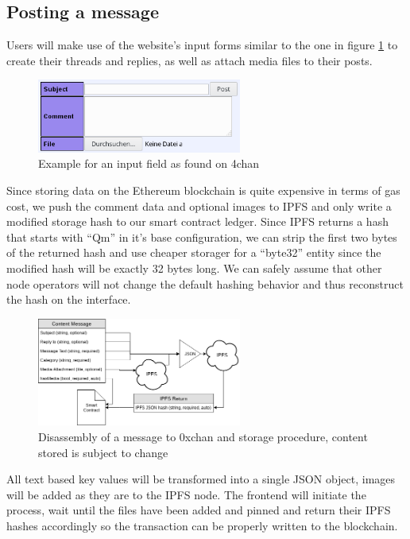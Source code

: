 \documentclass[a4paper]{article}
\begin{document}
\subsection{Posting a message}
Users will make use of the website's input forms similar to the one in figure \ref{fig:input} to create their threads and replies, as well as attach media files to their posts.

\begin{figure}[H]
  \centering
  \includegraphics[width=0.6\textwidth]{0x_4chan_post.png}
  \caption{Example for an input field as found on 4chan}
  \label{fig:input}
\end{figure}

Since storing data on the Ethereum blockchain is quite expensive in terms of gas cost, we push the comment data and optional images to IPFS and only write a modified storage hash to our smart contract ledger. Since IPFS returns a hash that starts with ``Qm'' in it's base configuration, we can strip the first two bytes of the returned hash and use cheaper storager for a ``byte32'' entity since the modified hash will be exactly 32 bytes long. We can safely assume that other node operators will not change the default hashing behavior and thus reconstruct the hash on the interface.

\begin{figure}[H]
  \centering
  \includegraphics[width=0.6\textwidth]{0x_logic.png}
  \caption{Disassembly of a message to 0xchan and storage procedure, content stored is subject to change}
  \label{fig:logic}
\end{figure}

All text based key values will be transformed into a single JSON object, images will be added as they are to the IPFS node. The frontend will initiate the process, wait until the files have been added and pinned and return their IPFS hashes accordingly so the transaction can be properly written to the blockchain.
\end{document}

